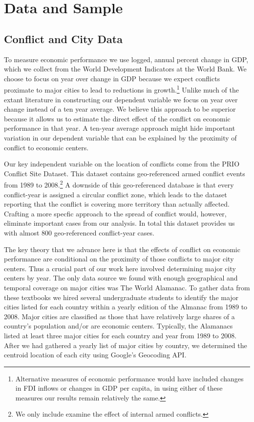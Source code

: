 \section{Data and Sample}
\label{empirics}

\subsection{Conflict and City Data}

To measure economic performance we use logged, annual percent change in GDP, which we collect from the World Development Indicators at the World Bank. We choose to focus on year over change in GDP because we expect conflicts proximate to major cities to lead to reductions in growth.\footnote{Alternative measures of economic performance would have included changes in FDI inflows or changes in GDP per capita, in using either of these measures our results remain relatively the same.} Unlike much of the extant literature in constructing our dependent variable we focus on year over change instead of a ten year average. We believe this approach to be superior because it allows us to estimate the direct effect of the conflict on economic performance in that year. A ten-year average approach might hide important variation in our dependent variable that can be explained by the proximity of conflict to economic centers.

Our key independent variable on the location of conflicts come from the PRIO Conflict Site Dataset. This dataset contains geo-referenced armed conflict events from 1989 to 2008.\footnote{We only include examine the effect of internal armed conflicts.} A downside of this geo-referenced database is that every conflict-year is assigned a circular conflict zone, which leads to the dataset reporting that the conflict is covering more territory than actually affected. Crafting a more specfic approach to the spread of conflict would, however, eliminate important cases from our analysis. In total this dataset provides us with almost 800 geo-referenced conflict-year cases. 


The key theory that we advance here is that the effects of conflict on economic performance are conditional on the proximity of those conflicts to major city centers. Thus a crucial part of our work here involved determining major city centers by year. The only data source we found with enough geographical and temporal coverage on major cities was The World Alamanac. To gather data from these textbooks we hired several undergraduate students to identify the major cities listed for each country within a yearly edition of the Almanac from 1989 to 2008. Major cities are classified as those that have relatively large shares of a country's population and/or are economic centers. Typically, the Alamanacs listed at least three major cities for each country and year from 1989 to 2008. After we had gathered a yearly list of major cities by country, we determined the centroid location of each city using Google's Geocoding API. 

